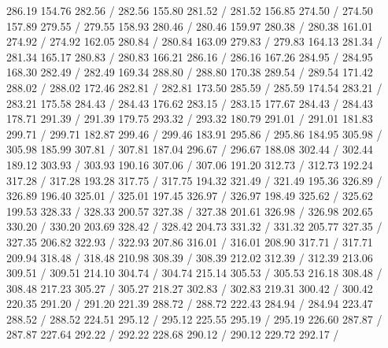 { 286.19 154.76 282.56 /
 282.56 155.80 281.52 /
 281.52 156.85 274.50 /
 274.50 157.89 279.55 /
 279.55 158.93 280.46 /
 280.46 159.97 280.38 /
 280.38 161.01 274.92 /
 274.92 162.05 280.84 /
 280.84 163.09 279.83 /
 279.83 164.13 281.34 /
 281.34 165.17 280.83 /
 280.83 166.21 286.16 /
 286.16 167.26 284.95 /
 284.95 168.30 282.49 /
 282.49 169.34 288.80 /
 288.80 170.38 289.54 /
 289.54 171.42 288.02 /
 288.02 172.46 282.81 /
 282.81 173.50 285.59 /
 285.59 174.54 283.21 /
 283.21 175.58 284.43 /
 284.43 176.62 283.15 /
 283.15 177.67 284.43 /
 284.43 178.71 291.39 /
 291.39 179.75 293.32 /
 293.32 180.79 291.01 /
 291.01 181.83 299.71 /
 299.71 182.87 299.46 /
 299.46 183.91 295.86 /
 295.86 184.95 305.98 /
 305.98 185.99 307.81 /
 307.81 187.04 296.67 /
 296.67 188.08 302.44 /
 302.44 189.12 303.93 /
 303.93 190.16 307.06 /
 307.06 191.20 312.73 /
 312.73 192.24 317.28 /
 317.28 193.28 317.75 /
 317.75 194.32 321.49 /
 321.49 195.36 326.89 /
 326.89 196.40 325.01 /
 325.01 197.45 326.97 /
 326.97 198.49 325.62 /
 325.62 199.53 328.33 /
 328.33 200.57 327.38 /
 327.38 201.61 326.98 /
 326.98 202.65 330.20 /
 330.20 203.69 328.42 /
 328.42 204.73 331.32 /
 331.32 205.77 327.35 /
 327.35 206.82 322.93 /
 322.93 207.86 316.01 /
 316.01 208.90 317.71 /
 317.71 209.94 318.48 /
 318.48 210.98 308.39 /
 308.39 212.02 312.39 /
 312.39 213.06 309.51 /
 309.51 214.10 304.74 /
 304.74 215.14 305.53 /
 305.53 216.18 308.48 /
 308.48 217.23 305.27 /
 305.27 218.27 302.83 /
 302.83 219.31 300.42 /
 300.42 220.35 291.20 /
 291.20 221.39 288.72 /
 288.72 222.43 284.94 /
 284.94 223.47 288.52 /
 288.52 224.51 295.12 /
 295.12 225.55 295.19 /
 295.19 226.60 287.87 /
 287.87 227.64 292.22 /
 292.22 228.68 290.12 /
 290.12 229.72 292.17 /
}
